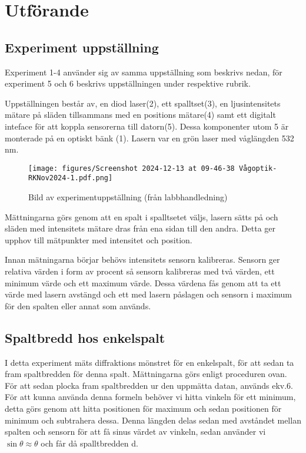 \documentclass[a4paper]{article}
\begin{document}
\section{Utförande}

\subsection{Experiment uppställning}

Experiment 1-4 använder sig av samma uppställning som beskrivs nedan, för experiment 5 och 6 beskrivs uppställningen under respektive rubrik.

Uppställningen består av, en diod laser(2), ett spalltset(3), en ljusintensitets mätare på släden tillsammans med en positions mätare(4) samt ett digitalt inteface för att koppla sensorerna till datorn(5). Dessa komponenter utom 5 är monterade på en optiskt bänk (1). Lasern var en grön laser med våglängden 532 nm. 

\begin{figure}[H]
    \begin{small}
        \begin{center}
            \texttt{[image: figures/Screenshot 2024-12-13 at 09-46-38 Vågoptik-RKNov2024-1.pdf.png]}
        \end{center}
        \caption{Bild av experimentuppställning (från labbhandledning)}
        \label{fig:uppställning}
    \end{small}
\end{figure}

Mättningarna görs genom att en spalt i spalltsetet väljs, lasern sätts på och släden med intensitets mätare dras från ena sidan till den andra. Detta ger upphov till mätpunkter med intensitet och position. 

Innan mätningarna börjar behövs intensitets sensorn kalibreras. Sensorn ger relativa värden i form av procent så sensorn kalibreras med två värden, ett minimum värde och ett maximum värde. Dessa värdena fås genom att ta ett värde med lasern avstängd och ett med lasern påslagen och sensorn i maximum för den spalten eller annat som används. 

\subsection{Spaltbredd hos enkelspalt}

I detta experiment mäts diffraktions mönstret för en enkelspalt, för att sedan ta fram spaltbredden för denna spalt. Mättningarna görs enligt proceduren ovan. För att sedan plocka fram spaltbredden ur den uppmätta datan, används ekv.6. För att kunna använda denna formeln behöver vi hitta vinkeln för ett minimum, detta görs genom att hitta positionen för maximum och sedan positionen för minimum och subtrahera dessa. Denna längden delas sedan med avståndet mellan spalten och sensorn för att få sinus värdet av vinkeln, sedan använder vi $\sin\theta \approx \theta$ och får då spalltbredden d.
\end{document}
